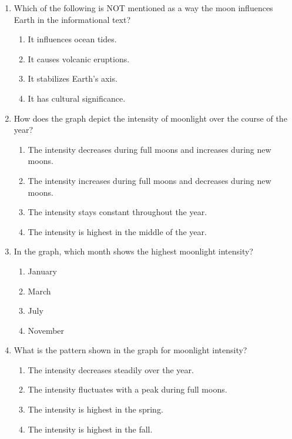 \documentclass[12pt]{article}
\begin{document}
\begin{enumerate}
\vspace{0.5cm}

\item Which of the following is NOT mentioned as a way the moon influences Earth in the informational text?
\begin{enumerate}[label=\Alph*.]
    \item It influences ocean tides.
    \item It causes volcanic eruptions.
    \item It stabilizes Earth’s axis.
    \item It has cultural significance.
\end{enumerate}

\vspace{0.5cm}

\item How does the graph depict the intensity of moonlight over the course of the year?
\begin{enumerate}[label=\Alph*.]
    \item The intensity decreases during full moons and increases during new moons.
    \item The intensity increases during full moons and decreases during new moons.
    \item The intensity stays constant throughout the year.
    \item The intensity is highest in the middle of the year.
\end{enumerate}

\vspace{0.5cm}

\item In the graph, which month shows the highest moonlight intensity?
\begin{enumerate}[label=\Alph*.]
    \item January
    \item March
    \item July
    \item November
\end{enumerate}

\vspace{0.5cm}

\item What is the pattern shown in the graph for moonlight intensity?
\begin{enumerate}[label=\Alph*.]
    \item The intensity decreases steadily over the year.
    \item The intensity fluctuates with a peak during full moons.
    \item The intensity is highest in the spring.
    \item The intensity is highest in the fall.
\end{enumerate}


\end{enumerate}
\end{document}
